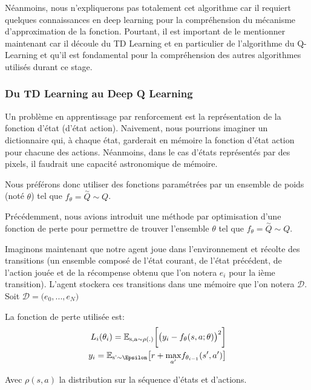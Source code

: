 Néanmoins, nous n'expliquerons pas totalement cet algorithme car il requiert quelques connaissances en deep learning pour la compréhension du mécanisme d'approximation de la fonction. Pourtant, il est important de le mentionner maintenant car il découle du TD Learning et en particulier de l'algorithme du Q-Learning et qu'il est fondamental pour la compréhension des autres algorithmes utilisés durant ce stage.

\subsubsection{Du TD Learning au Deep Q Learning}

Un problème en apprentissage par renforcement est la représentation de la fonction d'état (d'état action). Naivement, nous pourrions imaginer un dictionnaire qui, à chaque état, garderait en mémoire la fonction d'état action pour chacune des actions. Néanmoins, dans le cas d'états représentés par des pixels, il faudrait une capacité astronomique de mémoire. 

Nous préférons donc utiliser des fonctions paramétrées par un ensemble de poids (noté $\theta$) tel que $f_\theta = \overset{\sim}{Q} \sim Q$. 

Précédemment, nous avions introduit une méthode par optimisation d'une fonction de perte pour permettre de trouver l'ensemble $\theta$ tel que $f_\theta = \overset{\sim}{Q} \sim Q$. 

Imaginons maintenant que notre agent joue dans l'environnement et récolte des transitions (un ensemble composé de l'état courant, de l'état précédent, de l'action jouée et de la récompense obtenu que l'on notera $e_i$ pour la ième transition). L'agent stockera ces transitions dans une mémoire que l'on notera $\mathcal{D}$. Soit $\mathcal{D} = \big(e_0, ..., e_N\big)$ 

La fonction de perte utilisée est: 
\begin{align}
L_i(\theta_i) = \mathbb{E_{\text{s}, \text{a} \sim \rho(.)}}\bigg[ \big( y_i - f_\theta(s, a; \theta)\big)^2 \bigg]\\
y_i = \mathbb{E}_{\text{s'} \sim \Epsilon}\big[r + \underset{a'}{\max}f_{\theta_{i-1}}(s', a') \big] 
\end{align}

Avec $\rho(s, a)$ la distribution sur la séquence d'états et d'actions.
